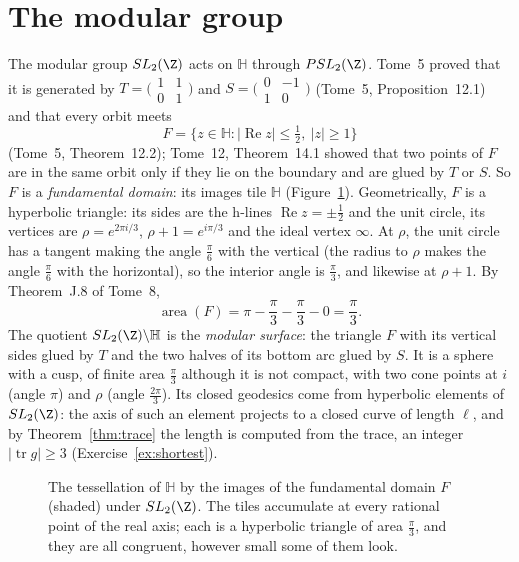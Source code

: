 \section{The modular group}

The modular group $SL_2(\Z)$ acts on $\mathbb H$ through $PSL_2(\Z)$. Tome~5 proved that it is generated by $T=\bigl(\begin{smallmatrix}1&1\\0&1\end{smallmatrix}\bigr)$ and $S=\bigl(\begin{smallmatrix}0&-1\\1&0\end{smallmatrix}\bigr)$
(Tome~5, Proposition~12.1) and that every orbit meets
\[F=\bigl\{z\in\mathbb H:|\operatorname{Re}z|\le\tfrac12,\ |z|\ge1\bigr\}\]
(Tome~5, Theorem~12.2); Tome~12, Theorem~14.1 showed that two points of $F$ are in the same orbit only if they lie on the boundary and are glued by $T$ or $S$. So $F$ is a \emph{fundamental
domain}: its images tile $\mathbb H$ (Figure~\ref{fig:modular}). Geometrically, $F$ is a hyperbolic triangle: its sides are the h-lines $\operatorname{Re}z=\pm\frac12$ and the unit circle, its vertices are
$\rho=e^{2\pi i/3}$, $\rho+1=e^{i\pi/3}$ and the ideal vertex $\infty$. At $\rho$, the unit circle has a tangent making the angle $\frac\pi6$ with the vertical (the radius to $\rho$ makes the angle $\frac\pi6$ with
the horizontal), so the interior angle is $\frac\pi3$, and likewise at $\rho+1$. By Theorem~J.8 of Tome~8,
\[\operatorname{area}(F)=\pi-\frac\pi3-\frac\pi3-0=\frac\pi3.\]
The quotient $SL_2(\Z)\backslash\mathbb H$ is the \emph{modular surface}: the triangle $F$ with its vertical sides glued by $T$ and the two halves of its bottom arc glued by $S$. It is a sphere with
a cusp, of finite area $\frac\pi3$ although it is not compact, with two cone points at $i$ (angle $\pi$) and $\rho$ (angle $\frac{2\pi}3$). Its closed geodesics come from hyperbolic elements of
$SL_2(\Z)$: the axis of such an element projects to a closed curve of length $\ell$, and by Theorem~\ref{thm:trace} the length is computed from the trace, an integer $|\operatorname{tr}g|\ge3$
(Exercise~\ref{ex:shortest}).

\begin{figure}[ht]
\centering
{}
\caption{The tessellation of $\mathbb H$ by the images of the fundamental domain $F$ (shaded) under $SL_2(\Z)$. The tiles accumulate at every rational point of the real axis; each is a
hyperbolic triangle of area $\frac\pi3$, and they are all congruent, however small some of them look.}
\label{fig:modular}
\end{figure}


